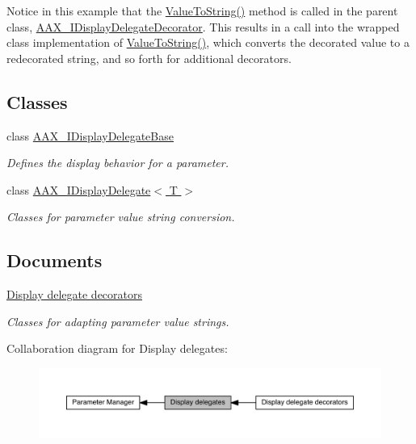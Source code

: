 Notice in this example that the \hyperlink{a00094_ada5780cfa332ac7946bf95aa65ae96f5}{Value\+To\+String()} method is called in the parent class, \hyperlink{a00094}{A\+A\+X\+\_\+\+I\+Display\+Delegate\+Decorator}. This results in a call into the wrapped class\textquotesingle{} implementation of \hyperlink{a00094_ada5780cfa332ac7946bf95aa65ae96f5}{Value\+To\+String()}, which converts the decorated value to a redecorated string, and so forth for additional decorators. \subsection*{Classes}
\begin{DoxyCompactItemize}
\item 
class \hyperlink{a00093}{A\+A\+X\+\_\+\+I\+Display\+Delegate\+Base}
\begin{DoxyCompactList}\small\item\em Defines the display behavior for a parameter. \end{DoxyCompactList}\item 
class \hyperlink{a00092}{A\+A\+X\+\_\+\+I\+Display\+Delegate$<$ T $>$}
\begin{DoxyCompactList}\small\item\em Classes for parameter value string conversion. \end{DoxyCompactList}\end{DoxyCompactItemize}
\subsection*{Documents}
\begin{DoxyCompactItemize}
\item 
\hyperlink{a00347}{Display delegate decorators}
\begin{DoxyCompactList}\small\item\em Classes for adapting parameter value strings. \end{DoxyCompactList}\end{DoxyCompactItemize}
Collaboration diagram for Display delegates\+:
\nopagebreak
\begin{figure}[H]
\begin{center}
\leavevmode
\includegraphics[width=350pt]{a00346}
\end{center}
\end{figure}
